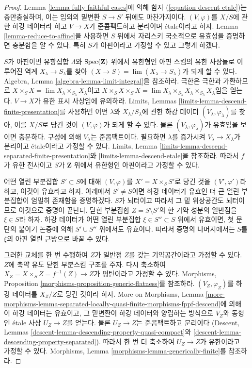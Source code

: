 \begin{proof}
Lemma \ref{lemma-fully-faithful-cases}에 의해 함자
(\ref{equation-descent-etale})는 충만충실하며,
이는 임의의 밑변환 $S \to S'$ 뒤에도 마찬가지이다.
$(V, \varphi)$를 $X/S$에 관한 하강 데이터라 하고
$V \to X$가 준콤팩트하고 분리이며 \'etale이라고 하자.
Lemma \ref{lemma-reduce-to-affine}을 사용하면 $S$ 위에서
자리스키 국소적으로 유효성을 증명하면 충분함을 알 수 있다.
특히 $S$가 아핀이라고 가정할 수 있고 그렇게 하겠다.

\medskip\noindent
$S$가 아핀이면 유향집합 $\Lambda$와
$\mathop{\mathrm{Spec}}(\mathbf{Z})$ 위에서 유한형인 아핀 스킴의 유한 사상들로 이루어진
역계 $X_\lambda \to S_\lambda$를 찾아
$(X \to S) = \lim (X_\lambda \to S_\lambda)$가 되게 할 수 있다.
Algebra, Lemma \ref{algebra-lemma-limit-integral}을 참조하라.
극한은 극한과 가환하므로
$X \times_S X = \lim X_\lambda \times_{S_\lambda} X_\lambda$이고
$X \times_S X \times_S X = \lim
X_\lambda \times_{S_\lambda} X_\lambda \times_{S_\lambda} X_\lambda$임을 얻는다.
$V \to X$가 유한 표시 사상임에 유의하라.
Limits, Lemmas \ref{limits-lemma-descend-finite-presentation}를 사용하면
어떤 $\lambda$와 $X_\lambda/S_\lambda$에 관한 하강 데이터
$(V_\lambda, \varphi_\lambda)$를 찾아, 이를 $X/S$로 당긴 것이
$(V, \varphi)$가 되게 할 수 있다.
물론 $(V_\lambda, \varphi_\lambda)$가 유효임을 보이면 충분하다.
구성에 의해 $V_\lambda$는 준콤팩트이다.
필요하면 $\lambda$를 증가시켜 $V_\lambda \to X_\lambda$가
분리이고 \'etale이라고 가정할 수 있다. Limits, Lemma
\ref{limits-lemma-descend-separated-finite-presentation}와
\ref{limits-lemma-descend-etale}을 참조하라.
따라서 $f$가 유한 전사이고 $S$가 $\mathbf{Z}$ 위에서
유한형인 아핀이라고 가정할 수 있다.

\medskip\noindent
어떤 열린 부분집합 $S' \subset S$에 대해 $(V, \varphi)$를
$X' = X \times_S S'$로 당긴 것을 $(V', \varphi')$라 하고,
이것이 유효라고 하자. 아래에서 $S' \not = S$이면 하강 데이터가
유효인 더 큰 열린 부분집합이 엄밀히 존재함을 증명하겠다.
$S$가 뇌터이고 따라서 그 밑 위상공간도 뇌터이므로 이것으로 증명이 끝난다.
닫힌 부분집합 $Z = S \setminus S'$의 한 기약 성분의 일반점을
$\xi \in S$라 하자. 하강 데이터가 어떤 열린 부분집합
$\xi \in S'' \subset S$ 위에서 유효이면, 첫 문단의 붙이기 논증에 의해
$S' \cup S''$ 위에서도 유효이다. 따라서 증명의 나머지에서는
$S$를 $\xi$의 아핀 열린 근방으로 바꿀 수 있다.

\medskip\noindent
그러한 교체를 한 번 수행하여 $Z$가 일반점 $Z$를 갖는 기약공간이라고
가정할 수 있다. $Z$에 축약 유도 닫힌 부분스킴 구조를 주자.
다시 축소하여
$X_Z = X \times_S Z = f^{-1}(Z) \to Z$가 평탄이라고 가정할 수 있다.
Morphisms, Proposition \ref{morphisms-proposition-generic-flatness}를 참조하라.
$(V_Z, \varphi_Z)$를 하강 데이터를 $X_Z/Z$로 당긴 것이라 하자.
More on Morphisms, Lemma
\ref{more-morphisms-lemma-separated-locally-quasi-finite-morphisms-fppf-descend}에
의해 이 하강 데이터는 유효이고, 그 밑변환이 하강 데이터와 양립하는
방식으로 $V_Z$와 동형인 \'etale 사상 $U_Z \to Z$를 얻는다.
물론 $U_Z \to Z$는 준콤팩트하고 분리이다
(Descent, Lemmas \ref{descent-lemma-descending-property-quasi-compact}와
\ref{descent-lemma-descending-property-separated}).
따라서 한 번 더 축소하여 $U_Z \to Z$가 유한이라고 가정할 수 있다.
Morphisms, Lemma \ref{morphisms-lemma-generically-finite}를 참조하라.


\end{proof}
